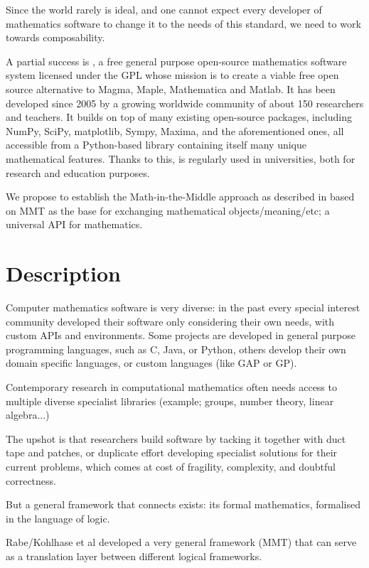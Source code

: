 Since the world rarely is ideal, and one cannot expect every developer of
mathematics software to change it to the needs of this standard, we need to work
towards composability.


A partial success is \Sage, a free general purpose open-source mathematics
software system licensed under the GPL whose mission is to create a
viable free open source alternative to Magma, Maple, Mathematica and
Matlab. It has been developed since 2005 by a growing worldwide community of
about 150 researchers and teachers. It builds on top of many existing
open-source packages, including NumPy, SciPy, matplotlib, Sympy,
Maxima, and the aforementioned ones, all accessible from a
Python-based library containing itself many unique mathematical
features.
Thanks to this, \Sage is regularly used in universities, both for
research and education purposes.

We propose to establish the Math-in-the-Middle approach as described in
 based on MMT as the base for exchanging mathematical
objects/meaning/etc; a universal API for mathematics.


\section{Description}

Computer mathematics software is very diverse: in the past every special
interest community developed their software only considering their own
needs, with custom APIs and environments. Some projects are developed in general
purpose programming languages, such as C, Java, or Python, others develop their
own domain specific languages, or custom languages (like GAP or GP).

Contemporary research in computational mathematics often needs access to
multiple diverse specialist libraries (example; groups, number theory, linear algebra...) 

The upshot is that researchers build software by tacking it together with duct
tape and patches, or duplicate effort developing specialist solutions for their
current problems, which comes at cost of fragility, complexity, and doubtful correctness.

But a general framework that connects exists: its formal mathematics, formalised
in the language of logic.

Rabe/Kohlhase et al developed a very general framework (MMT) that can serve as a
translation layer between different logical frameworks.

